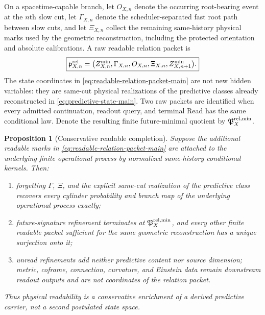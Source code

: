\documentclass[11pt]{article}
\newtheorem{proposition}[proposition]{Proposition}
\theoremstyle{definition}
\theoremstyle{remark}
\begin{document}
On a spacetime-capable branch, let $O_{X,n}$ denote the occurring root-bearing
event at the $n$th slow cut, let $\Gamma_{X,n}$ denote the scheduler-separated
fast root path between slow cuts, and let $\Xi_{X,n}$ collect the remaining
same-history physical marks used by the geometric reconstruction, including the
protected orientation and absolute calibrations.  A raw readable relation
packet is
\begin{equation}
 \boxed{
 \mathfrak p_{X,n}^{\rm rel}
 =\bigl(
 Z_{X,n}^{\min},\Gamma_{X,n},O_{X,n},\Xi_{X,n},Z_{X,n+1}^{\min}
 \bigr).}
 \label{eq:readable-relation-packet-main}
\end{equation}
The state coordinates in \eqref{eq:readable-relation-packet-main} are not new
hidden variables: they are same-cut physical realizations of the predictive
classes already reconstructed in \eqref{eq:predictive-state-main}.  Two raw
packets are identified when every admitted continuation, readout query, and
terminal Read has the same conditional law.  Denote the resulting finite
future-minimal quotient by $\mathfrak P_X^{\rm rel,min}$.

\begin{proposition}[Conservative readable completion]
\label{prop:readable-relational-completion}
Suppose the additional readable marks in
\eqref{eq:readable-relation-packet-main} are attached to the underlying finite
operational process by normalized same-history conditional kernels.  Then:
\begin{enumerate}[label=\textup{(\roman*)},leftmargin=2.8em]
\item forgetting $\Gamma$, $\Xi$, and the explicit same-cut realization of the
      predictive class recovers every cylinder probability and branch map of
      the underlying operational process exactly;
\item future-signature refinement terminates at
      $\mathfrak P_X^{\rm rel,min}$, and every other finite readable packet
      sufficient for the same geometric reconstruction has a unique surjection onto
      it;
\item unread refinements add neither predictive content nor source dimension;
      metric, coframe, connection, curvature, and Einstein data remain
      downstream readout outputs and are not coordinates of the relation
      packet.
\end{enumerate}
Thus physical readability is a conservative enrichment of a derived
predictive carrier, not a second postulated state space.
\end{proposition}
\end{document}
